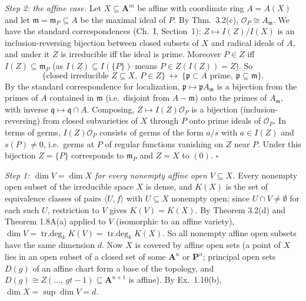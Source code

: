 \documentclass[11pt]{article}
\begin{document}
\emph{Step 2: the affine case.} Let $X\subseteq\mathbf A^m$ be affine with coordinate ring $A=A(X)$ and let $\mathfrak m=\mathfrak m_P\subseteq A$ be the maximal ideal of $P$. By Thm.~3.2(c), $\mathcal O_P\cong A_{\mathfrak m}$. We have the standard correspondences (Ch.~I, Section~1): $Z\mapsto I(Z)/I(X)$ is an inclusion-reversing bijection between closed subsets of $X$ and radical ideals of $A$, and under it $Z$ is irreducible iff the ideal is prime. Moreover $P\in Z$ iff $I(Z)\subseteq\mathfrak m_P$ (as $I(Z)\subseteq I(\{P\})$ means $P\in Z(I(Z))=Z$). So
\[
\{\text{closed irreducible }Z\subseteq X,\ P\in Z\}\ \longleftrightarrow\ \{\mathfrak p\subset A\text{ prime},\ \mathfrak p\subseteq\mathfrak m\}.
\]
By the standard correspondence for localization, $\mathfrak p\mapsto\mathfrak pA_{\mathfrak m}$ is a bijection from the primes of $A$ contained in $\mathfrak m$ (i.e.\ disjoint from $A-\mathfrak m$) onto the primes of $A_{\mathfrak m}$, with inverse $\mathfrak q\mapsto\mathfrak q\cap A$. Composing, $Z\mapsto I(Z)\mathcal O_P$ is a bijection (inclusion-reversing) from closed subvarieties of $X$ through $P$ onto prime ideals of $\mathcal O_P$. In terms of germs, $I(Z)\mathcal O_P$ consists of germs of the form $a/s$ with $a\in I(Z)$ and $s(P)\ne0$, i.e.\ germs at $P$ of regular functions vanishing on $Z$ near $P$. Under this bijection $Z=\{P\}$ corresponds to $\mathfrak m_P$ and $Z=X$ to $(0)$. \hfill$\square$


\pf
\emph{Step 1: $\dim V=\dim X$ for every nonempty affine open $V\subseteq X$.} Every nonempty open subset of the irreducible space $X$ is dense, and $K(X)$ is the set of equivalence classes of pairs $\langle U,f\rangle$ with $U\subseteq X$ nonempty open; since $U\cap V\neq\emptyset$ for each such $U$, restriction to $V$ gives $K(V)=K(X)$. By Theorem 3.2(d) and Theorem 1.8A(a) applied to $V$ (isomorphic to an affine variety), $\dim V=\operatorname{tr.deg}_k K(V)=\operatorname{tr.deg}_kK(X)$. So all nonempty affine open subsets have the same dimension $d$. Now $X$ is covered by affine open sets (a point of $X$ lies in an open subset of a closed set of some $\mathbf A^n$ or $\mathbf P^n$; principal open sets $D(g)$ of an affine chart form a base of the topology, and $D(g)\cong Z(\ldots,\,gt-1)\subseteq\mathbf A^{n+1}$ is affine). By Ex.~1.10(b), $\dim X=\sup\dim V=d$.
\end{document}
